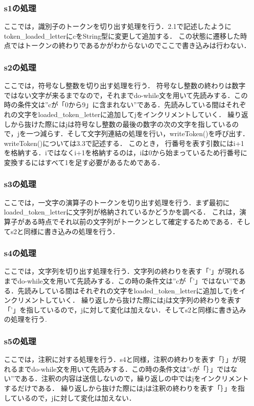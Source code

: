 \documentclass[dvipdfmx]{jarticle}
\begin{document}
\subsubsection{s1の処理}
ここでは，識別子のトークンを切り出す処理を行う．2.1で記述したようにtoken\_loaded\_letterにcをString型に変更して追加する．
この状態に遷移した時点ではトークンの終わりであるかがわからないのでここで書き込みは行わない．
\subsubsection{s2の処理}
ここでは，符号なし整数を切り出す処理を行う．
符号なし整数の終わりは数字ではない文字が来るまでなので，それまでdo-while文を用いて先読みする．この時の条件文は”cが「0から9」に含まれない”である．先読みしている間はそれぞれの文字をloaded\_token\_letterに追加してjをインクリメントしていく．
繰り返しから抜けた際にはjは符号なし整数の最後の数字の次の文字を指しているので，jを一つ減らす．そして文字列連結の処理を行い，writeToken()を呼び出す．writeToken()については3.3で記述する．
このとき，
行番号を表す引数にはi+1を格納する．iではなくi+1を格納するのは，iは0から始まっているため行番号に変換するにはすべて1を足す必要があるためである．
\subsubsection{s3の処理}
ここでは，一文字の演算子のトークンを切り出す処理を行う．まず最初にloaded\_token\_letterに文字列が格納されているかどうかを調べる．
これは，演算子がある時点でそれ以前の文字列がトークンとして確定するためである．そしてs2と同様に書き込みの処理を行う．
\subsubsection{s4の処理}
ここでは，文字列を切り出す処理を行う．文字列の終わりを表す「’」が現れるまでdo-while文を用いて先読みする．この時の条件文は”cが「’」ではない”である．先読みしている間はそれぞれの文字をloaded\_token\_letterに追加してjをインクリメントしていく．
繰り返しから抜けた際にはjは文字列の終わりを表す「’」を指しているので，jに対して変化は加えない．そしてs2と同様に書き込みの処理を行う.
\subsubsection{s5の処理}
ここでは，注釈に対する処理を行う．s4と同様，注釈の終わりを表す「｝」が現れるまでdo-while文を用いて先読みする．この時の条件文は”cが「｝」ではない”である．注釈の内容は送信しないので，繰り返しの中ではjをインクリメントするだけである．
繰り返しから抜けた際にはjは注釈の終わりを表す「｝」を指しているので，jに対して変化は加えない．
\end{document}
